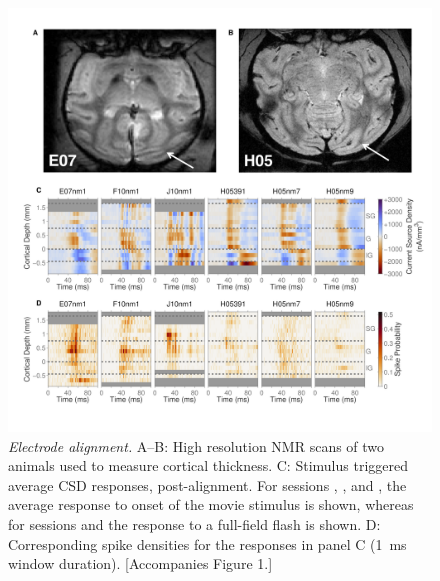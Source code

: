 \begin{figure}
\centering \includegraphics[width=\columnwidth]{paperfigs/figS1}
%
\caption{%
\textit{Electrode alignment.}
A--B: High resolution \ac{NMR} scans of two animals used to measure cortical thickness.
C: Stimulus triggered average \ac{CSD} responses, post-alignment.
For sessions , ,  and , the average response to onset of the movie stimulus is shown, whereas for sessions  and  the response to a full-field flash is shown.
D: Corresponding spike densities for the responses in panel C (\SI{1}{\milli\second} window duration).
[Accompanies Figure 1.]
}
\label{fig:lam_s1}
%
\end{figure}


